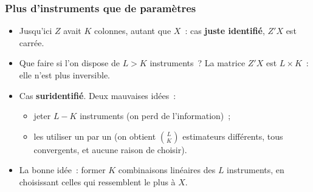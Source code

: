\documentclass[10pt]{beamer}
\begin{document}
\begin{frame}
  \frametitle{Plus d'instruments que de paramètres}

  \begin{itemize}

  \item Jusqu'ici $Z$ avait $K$ colonnes, autant que $X$~: cas \textbf{juste
      identifié}, $Z'X$ est carrée.\newline

  \item Que faire si l'on dispose de $L>K$ instruments~? La matrice $Z'X$
    est $L\times K$~: elle n'est plus inversible.\newline

  \item Cas \textbf{suridentifié}. Deux mauvaises idées~:
    \begin{itemize}
    \item jeter $L-K$ instruments (on perd de l'information)~;
    \item les utiliser un par un (on obtient $\binom{L}{K}$ estimateurs
      différents, tous convergents, et aucune raison de choisir).
    \end{itemize}

  \item[$\Rightarrow$] La bonne idée~: former $K$ combinaisons linéaires
    des $L$ instruments, en choisissant celles qui ressemblent le plus à $X$.

  \end{itemize}

\end{frame}
\end{document}
